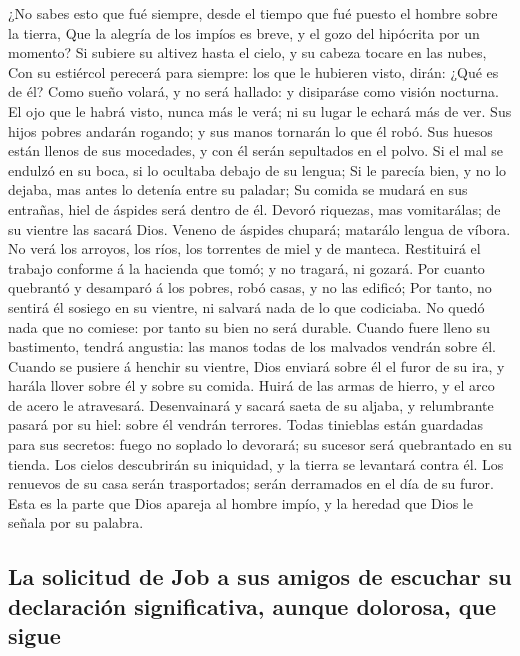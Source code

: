  ¿No sabes esto que fué siempre, desde el tiempo que fué
puesto el hombre sobre la tierra,  Que la alegría de los
impíos es breve, y el gozo del hipócrita por un momento? 
Si subiere su altivez hasta el cielo, y su cabeza tocare en las nubes,
 Con su estiércol perecerá para siempre: los que le
hubieren visto, dirán: ¿Qué es de él?  Como sueño volará,
y no será hallado: y disiparáse como visión nocturna.  El
ojo que le habrá visto, nunca más le verá; ni su lugar le echará más de
ver.  Sus hijos pobres andarán rogando; y sus manos
tornarán lo que él robó.  Sus huesos están llenos de sus
mocedades, y con él serán sepultados en el polvo.  Si el
mal se endulzó en su boca, si lo ocultaba debajo de su lengua;
 Si le parecía bien, y no lo dejaba, mas antes lo detenía
entre su paladar;  Su comida se mudará en sus entrañas,
hiel de áspides será dentro de él.  Devoró riquezas, mas
vomitarálas; de su vientre las sacará Dios.  Veneno de
áspides chupará; matarálo lengua de víbora.  No verá los
arroyos, los ríos, los torrentes de miel y de manteca. 
Restituirá el trabajo conforme á la hacienda que tomó; y no tragará, ni
gozará.  Por cuanto quebrantó y desamparó á los pobres,
robó casas, y no las edificó;  Por tanto, no sentirá él
sosiego en su vientre, ni salvará nada de lo que codiciaba.
 No quedó nada que no comiese: por tanto su bien no será
durable.  Cuando fuere lleno su bastimento, tendrá
angustia: las manos todas de los malvados vendrán sobre él.
 Cuando se pusiere á henchir su vientre, Dios enviará
sobre él el furor de su ira, y harála llover sobre él y sobre su comida.
 Huirá de las armas de hierro, y el arco de acero le
atravesará.  Desenvainará y sacará saeta de su aljaba, y
relumbrante pasará por su hiel: sobre él vendrán terrores.
 Todas tinieblas están guardadas para sus secretos: fuego
no soplado lo devorará; su sucesor será quebrantado en su tienda.
 Los cielos descubrirán su iniquidad, y la tierra se
levantará contra él.  Los renuevos de su casa serán
trasportados; serán derramados en el día de su furor. 
Esta es la parte que Dios apareja al hombre impío, y la heredad que Dios
le señala por su palabra.

\hypertarget{la-solicitud-de-job-a-sus-amigos-de-escuchar-su-declaraciuxf3n-significativa-aunque-dolorosa-que-sigue}{%
\subsection{La solicitud de Job a sus amigos de escuchar su declaración
significativa, aunque dolorosa, que
sigue}\label{la-solicitud-de-job-a-sus-amigos-de-escuchar-su-declaraciuxf3n-significativa-aunque-dolorosa-que-sigue}}

